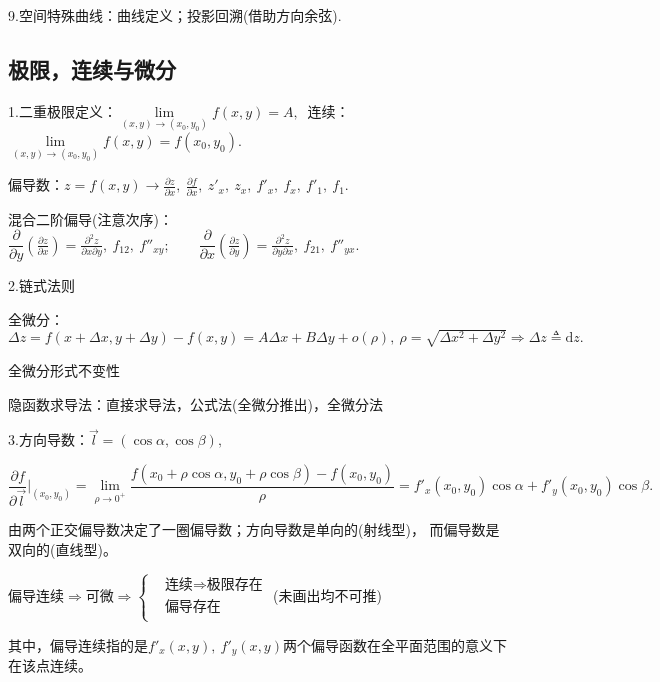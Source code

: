 \documentclass[UTF8]{ctexart}
\numberwithin{equation}{section}
\numberwithin{figure}{section}
\numberwithin{table}{section}
\newcommand\dif{\mathrm{d}}
\newcommand\no{\noindent}
\newcommand\dis{\displaystyle}
\newcommand\limit{\dis\lim\limits}
\newcommand\pzx{\dis\frac{\partial z}{\partial x}}
\newcommand\pzy{\dis\frac{\partial z}{\partial y}}
\newcommand\pfx{\dis\frac{\partial f}{\partial x}}
\newcommand\pzxy{\dis\frac{\partial^2 z}{\partial x\partial y}}
\newcommand\pzyx{\dis\frac{\partial^2 z}{\partial y\partial x}}
\begin{document}
\begin{spacing}{2}
\no9.空间特殊曲线：曲线定义；投影回溯(借助方向余弦).

\subsection{极限，连续与微分}

\no1.二重极限定义：$\limit_{(x,y)\to(x_0,y_0)}f(x,y)=A,\ $  
 连续：$\limit_{(x,y)\to(x_0,y_0)}f(x,y)=f(x_0,y_0).$

\begin{spacing}{2.5}

\no 偏导数：$z=f(x,y)\longrightarrow\pzx,\ \pfx,\ z'_x,\ z_x,\ f'_x,\ f_x,\ f'_1,\ f_1.$

\end{spacing}

\no 混合二阶偏导(注意次序)：$\dfrac{\partial}{\partial y}\left(\pzx\right)=\pzxy,
\ f_{12},\ f''_{xy};
\qquad\dfrac{\partial}{\partial x}\left(\pzy\right)=\pzyx,\ f_{21},\ f''_{yx}.$

\no2.链式法则

\no 全微分：$\dis\Delta z=f(x+\Delta x,y+\Delta y)-f(x,y)=A\Delta x+B\Delta y+o(\rho),\ 
\rho=\sqrt{\Delta x^2+\Delta y^2}\Rightarrow\Delta z\triangleq\dif z.$

\no 全微分形式不变性

\no 隐函数求导法：直接求导法，公式法(全微分推出)，全微分法

\no3.方向导数：$\stackrel{\rightarrow}{l}=(\cos\alpha,\cos\beta),$

$\dfrac{\partial f}{\partial \stackrel{\rightarrow}{l}}\Bigg|_{(x_0,y_0)}=
\limit_{\rho\to0^+}\dfrac{f(x_0+\rho\cos\alpha,y_0+\rho\cos\beta)-f(x_0,y_0)}{\rho}
=f'_x(x_0,y_0)\cos\alpha+f'_y(x_0,y_0)\cos\beta.$

\vspace{0.3cm}

由两个正交偏导数决定了一圈偏导数；方向导数是单向的(射线型)，
而偏导数是双向的(直线型)。

\vspace{0.3cm}

偏导连续$\Longrightarrow$可微$\Longrightarrow\left\{\begin{aligned}
&\text{连续}\Longrightarrow\text{极限存在}\\
&\text{偏导存在}\\
\end{aligned}\right.$
(未画出均不可推)

\vspace{0.3cm}

其中，偏导连续指的是$f'_x(x,y),\ f'_y(x,y)$两个偏导函数在全平面范围的意义下在该点连续。


\end{spacing}
\end{document}
